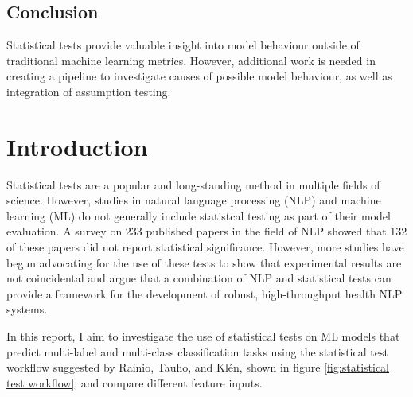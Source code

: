 \documentclass[10.7pt, onecolumn]{article}
\begin{document}
\subsection{Conclusion}

Statistical tests provide valuable insight into model behaviour outside of traditional machine learning metrics. However, additional work is needed in creating a pipeline to investigate causes of possible model behaviour, as well as integration of assumption testing.

\section{Introduction}\label{introduction}
Statistical tests are a popular and long-standing method in multiple fields of science. However, studies in natural language processing (NLP) and machine learning (ML) do not generally include statistcal testing as part of their model evaluation. A survey on 233 published papers in the field of NLP showed that 132 of these papers did not report statistical significance\cite{statsPaper}. However, more studies have begun advocating for the use of these tests to show that experimental results are not coincidental\cite{statsPaper} and argue that a combination of NLP and statistical tests can provide a framework for the development of robust, high-throughput health NLP systems\cite{10.1197/jamia.M3028}. 

In this report, I aim to investigate the use of statistical tests on ML models that predict multi-label and multi-class  classification tasks using the statistical test workflow suggested by Rainio, Tauho, and Klén\cite{statsBased}, shown in figure \ref{fig:statistical test workflow}, and compare different feature inputs.
\end{document}
